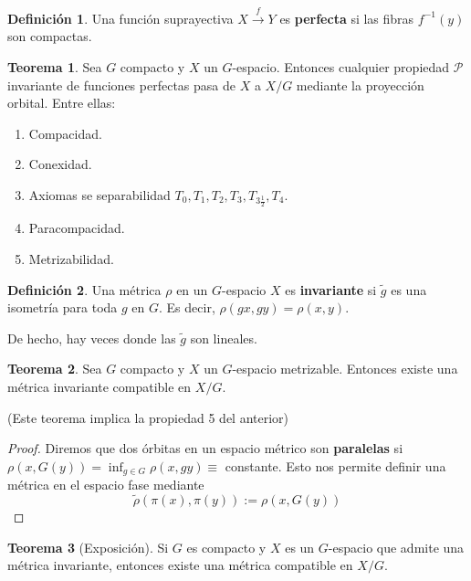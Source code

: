 \documentclass[spanish]{article}
\theoremstyle{definition}
\newtheorem*{defn}{Definición}
\newtheorem*{teo}{Teorema}
\begin{document}
\begin{defn}
	Una función suprayectiva $X\xrightarrow{f}Y$ es \textbf{perfecta} si las fibras $f^{-1}(y)$ son compactas.
\end{defn}
\begin{teo}
	Sea $G$ compacto y $X$ un $G$-espacio. Entonces cualquier propiedad $\mathcal{P}$ invariante de funciones perfectas pasa de $X$ a $X/G$ mediante la proyección orbital. Entre ellas:
	\begin{enumerate}
		\item Compacidad.
		\item Conexidad.
		\item Axiomas se separabilidad $T_0,T_1,T_2,T_3,T_{3\frac{1}{2}},T_4$.
		\item Paracompacidad.
		\item Metrizabilidad.
	\end{enumerate}
\end{teo}
\begin{defn}
	Una métrica $\rho$ en un $G$-espacio $X$ es \textbf{invariante} si $\tilde{g}$ es una isometría para toda $g$ en $G$. Es decir, $\rho(gx,gy)=\rho(x,y)$.
\end{defn}
De hecho, hay veces donde las $\tilde{g}$ son lineales.
\begin{teo}
	Sea $G$ compacto y $X$ un $G$-espacio metrizable. Entonces existe una métrica invariante compatible en $X/G$.
\end{teo}
(Este teorema implica la propiedad 5 del anterior)
\begin{proof}
	Diremos que dos órbitas en un espacio métrico son \textbf{paralelas} si $\rho(x,G(y))=\inf_{g\in G}\rho(x,gy)\equiv$ constante. Esto nos permite definir una métrica en el espacio fase mediante
\[\tilde{\rho}(\pi(x),\pi(y)):=\rho(x,G(y))\]
\end{proof}
\begin{teo}[Exposición]
	Si $G$ es compacto y $X$ es un $G$-espacio que admite una métrica invariante, entonces existe una métrica compatible en $X/G$.
\end{teo}
\end{document}
